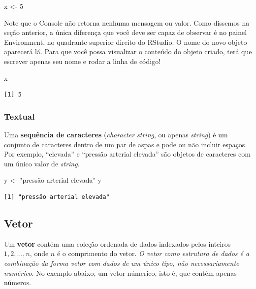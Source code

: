 \documentclass[
  letterpaper,
  DIV=11,
  numbers=noendperiod]{scrreprt}
\newenvironment{Shaded}{\begin{snugshade}}{\end{snugshade}}
\newcommand{\DecValTok}[1]{\textcolor[rgb]{0.68,0.00,0.00}{#1}}
\newcommand{\NormalTok}[1]{\textcolor[rgb]{0.00,0.23,0.31}{#1}}
\newcommand{\OtherTok}[1]{\textcolor[rgb]{0.00,0.23,0.31}{#1}}
\newcommand{\StringTok}[1]{\textcolor[rgb]{0.13,0.47,0.30}{#1}}
\begin{document}
\begin{Shaded}
\begin{Highlighting}[]
\NormalTok{x }\OtherTok{\textless{}{-}} \DecValTok{5} 
\end{Highlighting}
\end{Shaded}

Note que o Console não retorna nenhuma mensagem ou valor. Como dissemos
na seção anterior, a única diferença que você deve ser capaz de observar
é no painel Environment, no quadrante superior direito do RStudio. O
nome do novo objeto aparecerá lá. Para que você possa visualizar o
conteúdo do objeto criado, terá que escrever apenas seu nome e rodar a
linha de código!

\begin{Shaded}
\begin{Highlighting}[]
\NormalTok{x}
\end{Highlighting}
\end{Shaded}

\begin{verbatim}
[1] 5
\end{verbatim}

\subsubsection{Textual}\label{textual}

Uma \textbf{sequência de caracteres} (\emph{character string}, ou apenas
\emph{string}) é um conjunto de caracteres dentro de um par de aspas e
pode ou não incluir espaços. Por exemplo, ``elevada'' e ``pressão
arterial elevada'' são objetos de caracteres com um único valor de
\emph{string}.

\begin{Shaded}
\begin{Highlighting}[]
\NormalTok{y }\OtherTok{\textless{}{-}} \StringTok{"pressão arterial elevada"} 
\NormalTok{y}
\end{Highlighting}
\end{Shaded}

\begin{verbatim}
[1] "pressão arterial elevada"
\end{verbatim}

\subsection{Vetor}\label{vetor}

Um \textbf{vetor} contém uma coleção ordenada de dados indexados pelos
inteiros \(1, 2,..., n\), onde \(n\) é o comprimento do vetor. \emph{O
vetor como estrutura de dados é a combinação da forma vetor com dados de
um único tipo, não necessariamente numérico.} No exemplo abaixo, um
vetor númerico, isto é, que contém apenas números.
\end{document}
